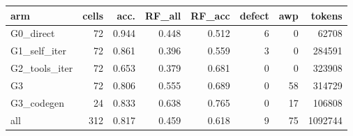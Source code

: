 \begin{tabular}{lrrrrrrr}
\toprule
arm & cells & acc. & RF\_all & RF\_acc & defect & awp & tokens \\
\midrule
G0\_direct & 72 & 0.944 & 0.448 & 0.512 & 6 & 0 & 62708 \\
G1\_self\_iter & 72 & 0.861 & 0.396 & 0.559 & 3 & 0 & 284591 \\
G2\_tools\_iter & 72 & 0.653 & 0.379 & 0.681 & 0 & 0 & 323908 \\
G3 & 72 & 0.806 & 0.555 & 0.689 & 0 & 58 & 314729 \\
G3\_codegen & 24 & 0.833 & 0.638 & 0.765 & 0 & 17 & 106808 \\
\midrule
all & 312 & 0.817 & 0.459 & 0.618 & 9 & 75 & 1092744 \\
\bottomrule
\end{tabular}
